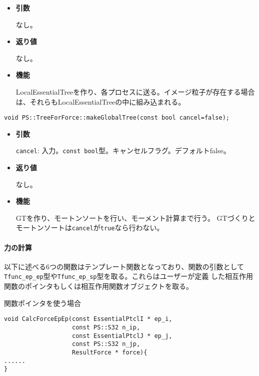 \begin{itemize}

\item{{\bf 引数}}

なし。

\item{{\bf 返り値}}

なし。

\item{{\bf 機能}}

LocalEssentialTreeを作り、各プロセスに送る。イメージ粒子が存在する場合
は、それらもLocalEssentialTreeの中に組み込まれる。

\end{itemize}


\begin{screen}
\begin{verbatim}
void PS::TreeForForce::makeGlobalTree(const bool cancel=false);
\end{verbatim}
\end{screen}
\begin{itemize}

\item{{\bf 引数}}

{\tt cancel}: 入力。{\tt const bool}型。キャンセルフラグ。デフォルトfalse。

\item{{\bf 返り値}}

なし。

\item{{\bf 機能}}

GTを作り、モートンソートを行い、モーメント計算まで行う。
GTづくりとモートンソートは{\tt cancel}が{\tt true}なら行わない。

\end{itemize}


\paragraph{力の計算}
\mbox{}

以下に述べる6つの関数はテンプレート関数となっており、関数の引数として
{\tt Tfunc\_ep\_ep}型や{\tt Tfunc\_ep\_sp}型を取る。これらはユーザーが定義
した相互作用関数のポインタもしくは相互作用関数オブジェクトを取る。

関数ポインタを使う場合
\begin{lstlisting}[caption=関数ポインタを使う場合]
void CalcForceEpEp(const EssentialPtclI * ep_i,
                   const PS::S32 n_ip,
                   const EssentialPtclJ * ep_j,
                   const PS::S32 n_jp,
                   ResultForce * force){
......
}
\end{lstlisting}

